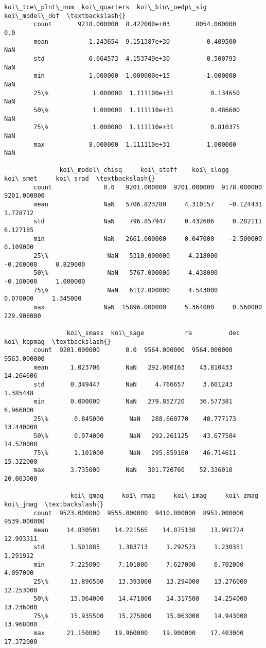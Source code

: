 \documentclass[11pt]{article}
\begin{document}
\begin{Verbatim}[commandchars=\\\{\}]
               koi\_tce\_plnt\_num  koi\_quarters  koi\_bin\_oedp\_sig  koi\_model\_dof  \textbackslash{}
        count       9218.000000  8.422000e+03       8054.000000            0.0   
        mean           1.243654  9.151387e+30          0.409500            NaN   
        std            0.664573  4.153749e+30          0.500793            NaN   
        min            1.000000  1.000000e+15         -1.000000            NaN   
        25\%            1.000000  1.111100e+31          0.134650            NaN   
        50\%            1.000000  1.111110e+31          0.486600            NaN   
        75\%            1.000000  1.111110e+31          0.810375            NaN   
        max            8.000000  1.111110e+31          1.000000            NaN   
        
               koi\_model\_chisq     koi\_steff    koi\_slogg     koi\_smet     koi\_srad  \textbackslash{}
        count              0.0   9201.000000  9201.000000  9178.000000  9201.000000   
        mean               NaN   5706.823280     4.310157    -0.124431     1.728712   
        std                NaN    796.857947     0.432606     0.282111     6.127185   
        min                NaN   2661.000000     0.047000    -2.500000     0.109000   
        25\%                NaN   5310.000000     4.218000    -0.260000     0.829000   
        50\%                NaN   5767.000000     4.438000    -0.100000     1.000000   
        75\%                NaN   6112.000000     4.543000     0.070000     1.345000   
        max                NaN  15896.000000     5.364000     0.560000   229.908000   
        
                 koi\_smass  koi\_sage           ra          dec   koi\_kepmag  \textbackslash{}
        count  9201.000000       0.0  9564.000000  9564.000000  9563.000000   
        mean      1.023706       NaN   292.060163    43.810433    14.264606   
        std       0.349447       NaN     4.766657     3.601243     1.385448   
        min       0.000000       NaN   279.852720    36.577381     6.966000   
        25\%       0.845000       NaN   288.660770    40.777173    13.440000   
        50\%       0.974000       NaN   292.261125    43.677504    14.520000   
        75\%       1.101000       NaN   295.859160    46.714611    15.322000   
        max       3.735000       NaN   301.720760    52.336010    20.003000   
        
                  koi\_gmag     koi\_rmag     koi\_imag     koi\_zmag     koi\_jmag  \textbackslash{}
        count  9523.000000  9555.000000  9410.000000  8951.000000  9539.000000   
        mean     14.830501    14.221565    14.075138    13.991724    12.993311   
        std       1.501885     1.383713     1.292573     1.230351     1.291912   
        min       7.225000     7.101000     7.627000     6.702000     4.097000   
        25\%      13.896500    13.393000    13.294000    13.276000    12.253000   
        50\%      15.064000    14.471000    14.317500    14.254000    13.236000   
        75\%      15.935500    15.275000    15.063000    14.943000    13.968000   
        max      21.150000    19.960000    19.900000    17.403000    17.372000   
        

\end{Verbatim}
\end{document}
